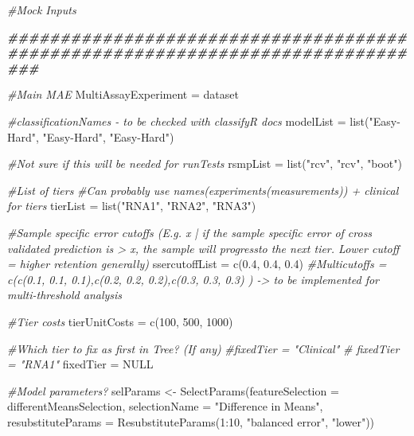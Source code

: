 \documentclass[
]{article}
\newenvironment{Shaded}{\begin{snugshade}}{\end{snugshade}}
\newcommand{\AttributeTok}[1]{\textcolor[rgb]{0.77,0.63,0.00}{#1}}
\newcommand{\CommentTok}[1]{\textcolor[rgb]{0.56,0.35,0.01}{\textit{#1}}}
\newcommand{\ConstantTok}[1]{\textcolor[rgb]{0.00,0.00,0.00}{#1}}
\newcommand{\DecValTok}[1]{\textcolor[rgb]{0.00,0.00,0.81}{#1}}
\newcommand{\DocumentationTok}[1]{\textcolor[rgb]{0.56,0.35,0.01}{\textbf{\textit{#1}}}}
\newcommand{\FloatTok}[1]{\textcolor[rgb]{0.00,0.00,0.81}{#1}}
\newcommand{\FunctionTok}[1]{\textcolor[rgb]{0.00,0.00,0.00}{#1}}
\newcommand{\NormalTok}[1]{#1}
\newcommand{\OtherTok}[1]{\textcolor[rgb]{0.56,0.35,0.01}{#1}}
\newcommand{\SpecialCharTok}[1]{\textcolor[rgb]{0.00,0.00,0.00}{#1}}
\newcommand{\StringTok}[1]{\textcolor[rgb]{0.31,0.60,0.02}{#1}}
\begin{document}
\begin{Shaded}
\begin{Highlighting}[]
\CommentTok{\#Mock Inputs}
  
\DocumentationTok{\#\#\#\#\#\#\#\#\#\#\#\#\#\#\#\#\#\#\#\#\#\#\#\#\#\#\#\#\#\#\#\#\#\#\#\#\#\#\#\#\#\#\#\#\#\#\#\#\#\#\#\#\#\#\#\#\#\#\#\#\#\#\#\#\#\#\#\#\#\#\#\#\#\#\#\#\#\#\#}

\CommentTok{\#Main MAE                                   }
\NormalTok{MultiAssayExperiment }\OtherTok{=}\NormalTok{ dataset}

\CommentTok{\#classificationNames {-} to be checked with classifyR docs}
\NormalTok{modelList }\OtherTok{=} \FunctionTok{list}\NormalTok{(}\StringTok{"Easy{-}Hard"}\NormalTok{, }\StringTok{"Easy{-}Hard"}\NormalTok{, }\StringTok{"Easy{-}Hard"}\NormalTok{) }

\CommentTok{\#Not sure if this will be needed for runTests}
\NormalTok{rsmpList }\OtherTok{=} \FunctionTok{list}\NormalTok{(}\StringTok{"rcv"}\NormalTok{, }\StringTok{"rcv"}\NormalTok{, }\StringTok{"boot"}\NormalTok{)}

\CommentTok{\#List of tiers}
\CommentTok{\#Can probably use names(experiments(measurements)) + clinical for tiers}
\NormalTok{tierList }\OtherTok{=} \FunctionTok{list}\NormalTok{(}\StringTok{"RNA1"}\NormalTok{, }\StringTok{"RNA2"}\NormalTok{, }\StringTok{"RNA3"}\NormalTok{) }

\CommentTok{\#Sample specific error cutoffs (E.g. x | if the sample specific error of cross validated prediction is \textgreater{} x, the sample will \textquotesingle{}progress\textquotesingle{}to the next tier. Lower cutoff = higher retention generally)}
\NormalTok{ssercutoffList }\OtherTok{=} \FunctionTok{c}\NormalTok{(}\FloatTok{0.4}\NormalTok{, }\FloatTok{0.4}\NormalTok{, }\FloatTok{0.4}\NormalTok{)}
\CommentTok{\#Multicutoffs = c(c(0.1, 0.1, 0.1),c(0.2, 0.2, 0.2),c(0.3, 0.3, 0.3) ) {-}\textgreater{} to be implemented for multi{-}threshold analysis}

\CommentTok{\#Tier costs}
\NormalTok{tierUnitCosts }\OtherTok{=} \FunctionTok{c}\NormalTok{(}\DecValTok{100}\NormalTok{, }\DecValTok{500}\NormalTok{, }\DecValTok{1000}\NormalTok{)}

\CommentTok{\#Which tier to fix as first in Tree? (If any)}
\CommentTok{\#fixedTier = "Clinical"}
\CommentTok{\# fixedTier = "RNA1"}
\NormalTok{fixedTier }\OtherTok{=} \ConstantTok{NULL}

\CommentTok{\#Model parameters?}
\NormalTok{selParams }\OtherTok{\textless{}{-}} \FunctionTok{SelectParams}\NormalTok{(}\AttributeTok{featureSelection =}\NormalTok{ differentMeansSelection, }\AttributeTok{selectionName =} \StringTok{"Difference in Means"}\NormalTok{,}
                            \AttributeTok{resubstituteParams =} \FunctionTok{ResubstituteParams}\NormalTok{(}\DecValTok{1}\SpecialCharTok{:}\DecValTok{10}\NormalTok{, }\StringTok{"balanced error"}\NormalTok{, }\StringTok{"lower"}\NormalTok{))}


\end{Highlighting}
\end{Shaded}
\end{document}
